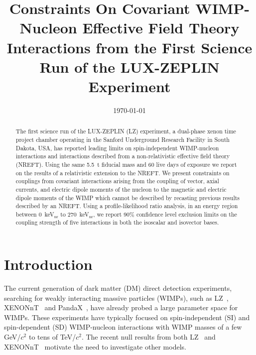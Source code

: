 \documentclass[reprint, showpacs,
preprintnumbers,
amsmath,amssymb,
aps, floatfix,
superscriptaddress,
prd, nofootinbib]{revtex4-1}
\begin{document}
\title{Constraints On Covariant WIMP-Nucleon Effective Field Theory Interactions from the First Science Run of the LUX-ZEPLIN Experiment}


\date{\today}

\begin{abstract}
The first science run of the LUX-ZEPLIN (LZ) experiment, a dual-phase xenon time project chamber operating in the Sanford Underground Research Facility in South Dakota, USA, has reported leading limits on spin-independent WIMP-nucleon interactions and interactions described from a non-relativistic effective field theory (NREFT).
Using the same 5.5~t fiducial mass and 60 live days of exposure we report on the results of a relativistic extension to the NREFT.
We present constraints on couplings from covariant interactions arising from the coupling of vector, axial currents, and electric dipole moments of the nucleon to the magnetic and electric dipole moments of the WIMP which cannot be described by recasting previous results described by an NREFT.
Using a profile-likelihood ratio analysis, in an energy region between 0~keV$_\text{nr}$ to 270~keV$_\text{nr}$, we report 90\% confidence level exclusion limits on the coupling strength of five interactions in both the isoscalar and isovector bases.
\end{abstract}

\maketitle

\section{\label{sec:introduction}Introduction}
The current generation of dark matter (DM) direct detection experiments, searching for weakly interacting massive particles (WIMPs), such as LZ~\cite{LZ:Experiment_2020}, XENONnT~\cite{XenonNT:WS_2023} and PandaX~\cite{PandaX4T:SI2023}, have already probed a large parameter space for WIMPs.
These experiments have typically focused on spin-independent (SI) and spin-dependent (SD) WIMP-nucleon interactions with WIMP masses of a few GeV/$c^{2}$ to tens of TeV/$c^{2}$. 
The recent null results from both LZ~\cite{LZ:SR1WS_2022} and XENONnT~\cite{XenonNT:WS_2023} motivate the need to investigate other models.
\end{document}
